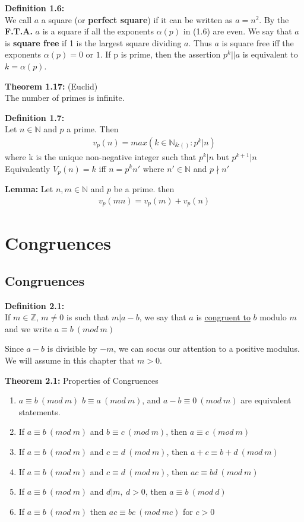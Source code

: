 \documentclass[a4paper]{article}
\begin{document}
\textbf{Definition 1.6:}\\
We call $a$ a square (or \textbf{perfect square}) if it can be written as $a=n^2$. By the \textbf{F.T.A.} $a$ is a square if all the exponents $\alpha(p)$ in (1.6) are even. We say that $a$ is \textbf{square free} if 1 is the largest square dividing $a$. Thus $a$ is square free iff the exponents $\alpha(p)=0$ or $1$. If p is prime, then the assertion $p^k||a$ is equivalent to $k=\alpha(p)$.

\textbf{Theorem 1.17:} (Euclid)\\
The number of primes is infinite.

\textbf{Definition 1.7:}\\
Let $n\in\mathbb{N}$ and $p$ a prime. Then
\begin{align}
    v_p(n) = max(k\in\mathbb{N}_{\&()}:p^k|n)
\end{align}
where k is the unique non-negative integer such that $p^k|n$ but $p^{k+1}|n$\\
Equivalently $V_p(n)=k$ iff $n=p^kn'$ where $n'\in\mathbb{N}$ and $p\nmid n'$

\textbf{Lemma:}
Let $n,m\in\mathbb{N}$ and $p$ be a prime. then
\begin{align}
    v_p(mn)=v_p(m)+v_p(n)
\end{align}


\section{Congruences}

\subsection{Congruences}

\textbf{Definition 2.1:}\\
If $m\in\mathbb{Z}$, $m\neq0$ is such that $m|a-b$, we say that $a$ is \underline{congruent to} $b$ modulo $m$ and we write $a\equiv b\ (mod\ m)$

Since $a-b$ is divisible by $-m$, we can socus our attention to a positive modulus. We will assume in this chapter that $m>0$.

\textbf{Theorem 2.1:} Properties of Congruences
\begin{enumerate}
    \item $a\equiv b\ (mod\ m)$ $b\equiv a\ (mod\ m)$, and $a-b\equiv 0\ (mod\ m)$ are equivalent statements.
    \item If $a\equiv b\ (mod\ m)$ and $b\equiv c\ (mod\ m)$, then $a\equiv c\ (mod\ m)$
    \item If $a\equiv b\ (mod\ m)$ and $c\equiv d\ (mod\ m)$, then $a+c\equiv b+d\ (mod\ m)$
    \item If $a\equiv b\ (mod\ m)$ and $c\equiv d\ (mod\ m)$, then $ac\equiv bd\ (mod\ m)$
    \item If $a\equiv b\ (mod\ m)$ and $d|m,\ d>0$, then $a\equiv b\ (mod\ d)$
    \item If $a\equiv b\ (mod\ m)$ then $ac\equiv bc\ (mod\ mc)$ for $c>0$
\end{enumerate}
\end{document}
